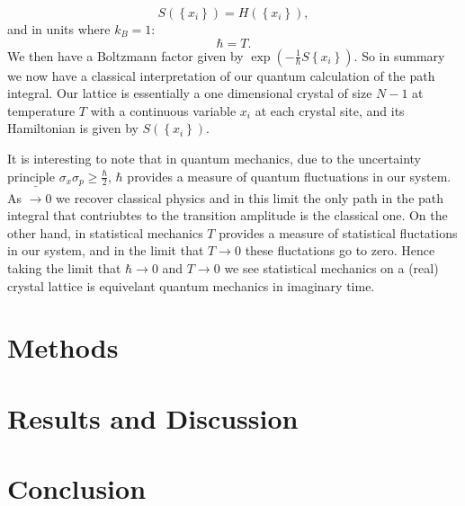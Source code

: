 \documentclass[12pt]{article}
\begin{document}
\begin{equation}
	\label{ActionToHamiltonian}
	S\left(\left\{x_{i}\right\}\right) = H\left(\left\{x_{i}\right\}\right),
\end{equation}
and in units where $k_{B} = 1$:
\begin{equation}
	\label{PlankToBoltzman}
	\hbar = T.
\end{equation}
We then have a Boltzmann factor given by $\exp{\left(-\frac{1}{\hbar}S\left\{x_{i}\right\}\right)}$. So in summary we now have a classical interpretation of our quantum calculation of the path integral. Our lattice is essentially a one dimensional crystal of size $N-1$ at temperature $T$ with a continuous variable $x_i$ at each crystal site, and its Hamiltonian is given by $S\left(\left\{x_i\right\}\right)$.

It is interesting to note that in quantum mechanics, due to the uncertainty principle $\sigma_x\sigma_p \geq \frac{\hbar}{2}$, $\hbar$ provides a measure of quantum fluctuations in our system. As $\bar \rightarrow 0$ we recover classical physics and in this limit the only path in the path integral that contriubtes to the transition amplitude is the classical one. On the other hand, in statistical mechanics $T$ provides a measure of statistical fluctations in our system, and in the limit that $T \rightarrow 0$ these fluctations go to zero. Hence taking the limit that $\hbar \rightarrow 0$ and $T \rightarrow 0$ we see statistical mechanics on a (real) crystal lattice is equivelant quantum mechanics in imaginary time.

\section{Methods}

\section{Results and Discussion}


\section{Conclusion}





\end{document}
